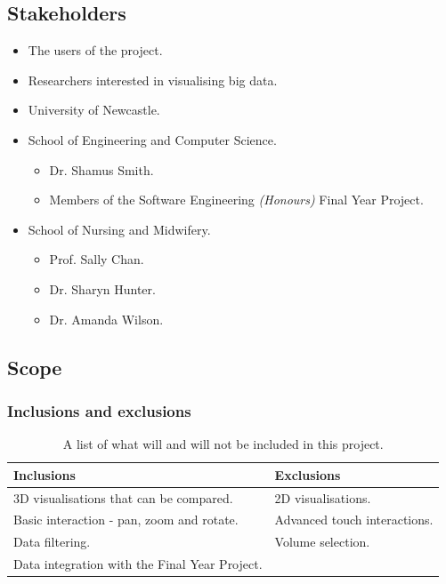 \documentclass[
	fontsize=11pt
	headlines=2,
	footlines=2,
	parskip=half
]{scrartcl}
\begin{document}
{		\subsection{Stakeholders} {
		\label{sec:stakeholders}

			\begin{itemize}
				\item The users of the project.
				\item Researchers interested in visualising big data.
				\item University of Newcastle.
				\item School of Engineering and Computer Science.
				\begin{itemize}
					\item Dr. Shamus Smith.
					\item Members of the Software Engineering \emph{(Honours)} Final Year Project.
				\end{itemize}
				\item School of Nursing and Midwifery.
				\begin{multicols}{3}
				\begin{itemize}
					\item Prof. Sally Chan.
					\item Dr. Sharyn Hunter.
					\item Dr. Amanda Wilson.
				\end{itemize}
				\end{multicols}
			\end{itemize}		
		
		}
		
		\subsection{Scope} {
		\label{sec:scope}
		
			\subsubsection{Inclusions and exclusions} {
			\label{sec:inclusions_and_exclusions}
			
				\begin{table}[H]
				\caption{A list of what will and will not be included in this project.}
				\begin{tabularx}{\textwidth}{@{}XX@{}}
					\toprule
					\textbf{Inclusions} & \textbf{Exclusions} \\
					\midrule
					3D visualisations that can be compared. & 2D visualisations. \\
					Basic interaction - pan, zoom and rotate. & Advanced touch interactions. \\
					Data filtering. & Volume selection. \\
					Data integration with the Final Year Project. & \\
					\bottomrule
				\end{tabularx}
				\end{table}
			
}}}
\end{document}
